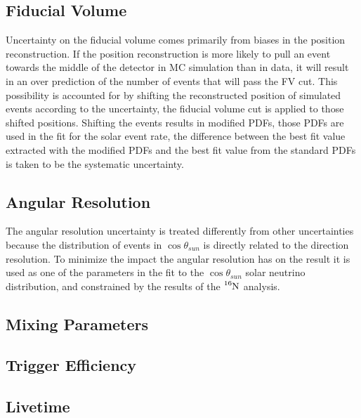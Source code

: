 \subsection{Fiducial Volume}
Uncertainty on the fiducial volume comes primarily from biases in the position reconstruction.
If the position reconstruction is more likely to pull an event towards the middle of the detector
in MC simulation than in data, it will result in an over prediction of the number of events that will
pass the FV cut.
This possibility is accounted for by shifting the reconstructed position of simulated events according
to the uncertainty, the fiducial volume cut is applied to those shifted positions.
Shifting the events results in modified PDFs, those PDFs are used in the fit for the solar event rate,
the difference between the best fit value extracted with the modified PDFs and the best fit value from
the standard PDFs is taken to be the systematic uncertainty.
\subsection{Angular Resolution}
The angular resolution uncertainty is treated differently from other uncertainties because the
distribution of events in $\cos\theta_{sun}$ is directly related to the direction resolution.
 To minimize the impact the angular resolution has on the result it is used as one of the parameters
 in the fit to the $\cos\theta_{sun}$ solar neutrino distribution, and constrained by the results
 of the $\ce{^{16}N}$ analysis.

\subsection{Mixing Parameters}
\subsection{Trigger Efficiency}
\subsection{Livetime}

